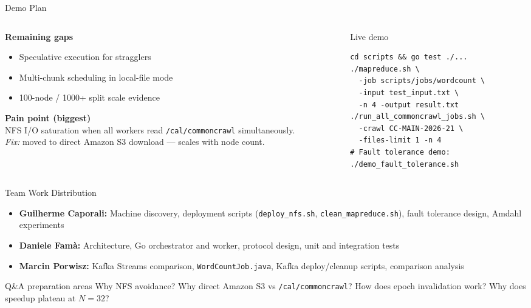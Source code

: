 \documentclass[aspectratio=169,10pt]{beamer}
\begin{document}
\begin{frame}[fragile]{Demo Plan}
  \begin{columns}[T,onlytextwidth]
    \begin{column}{0.50\textwidth}
      \textbf{Remaining gaps}
      \begin{itemize}
        \item Speculative execution for stragglers
        \item Multi-chunk scheduling in local-file mode
        \item 100-node / 1000+ split scale evidence
      \end{itemize}
      \textbf{Pain point (biggest)}\\
      NFS I/O saturation when all workers read \texttt{/cal/commoncrawl} simultaneously.\\
      \textit{Fix:} moved to direct Amazon S3 download — scales with node count.
    \end{column}
    \begin{column}{0.47\textwidth}
      \begin{block}{Live demo}
\begin{lstlisting}[basicstyle=\ttfamily\scriptsize]
cd scripts && go test ./...
./mapreduce.sh \
  -job scripts/jobs/wordcount \
  -input test_input.txt \
  -n 4 -output result.txt
./run_all_commoncrawl_jobs.sh \
  -crawl CC-MAIN-2026-21 \
  -files-limit 1 -n 4
# Fault tolerance demo:
./demo_fault_tolerance.sh
\end{lstlisting}
      \end{block}
    \end{column}
  \end{columns}
\end{frame}

\begin{frame}{Team Work Distribution}
  \begin{itemize}
    \item \textbf{Guilherme Caporali:} Machine discovery, deployment scripts (\texttt{deploy\_nfs.sh}, \texttt{clean\_mapreduce.sh}), fault tolerance design, Amdahl experiments
    \item \textbf{Daniele Famà:} Architecture, Go orchestrator and worker, protocol design, unit and integration tests
    \item \textbf{Marcin Porwisz:} Kafka Streams comparison, \texttt{WordCountJob.java}, Kafka deploy/cleanup scripts, comparison analysis
  \end{itemize}
  \vspace{1em}
  \begin{block}{Q\&A preparation areas}
    Why NFS avoidance? Why direct Amazon S3 vs \texttt{/cal/commoncrawl}? How does epoch invalidation work? Why does speedup plateau at $N=32$?
  \end{block}
\end{frame}
\end{document}
